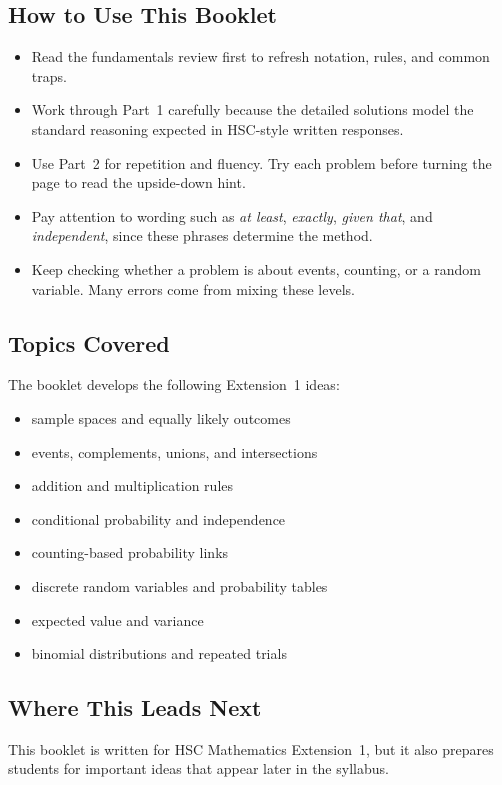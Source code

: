\documentclass[12pt]{article}
\begin{document}
\subsection{How to Use This Booklet}
\begin{itemize}[leftmargin=*]
  \item Read the fundamentals review first to refresh notation, rules, and common traps.
  \item Work through Part~1 carefully because the detailed solutions model the standard reasoning expected in HSC-style written responses.
  \item Use Part~2 for repetition and fluency. Try each problem before turning the page to read the upside-down hint.
  \item Pay attention to wording such as \textit{at least}, \textit{exactly}, \textit{given that}, and \textit{independent}, since these phrases determine the method.
  \item Keep checking whether a problem is about events, counting, or a random variable. Many errors come from mixing these levels.
\end{itemize}

\subsection{Topics Covered}
The booklet develops the following Extension~1 ideas:
\begin{itemize}[leftmargin=*]
  \item sample spaces and equally likely outcomes
  \item events, complements, unions, and intersections
  \item addition and multiplication rules
  \item conditional probability and independence
  \item counting-based probability links
  \item discrete random variables and probability tables
  \item expected value and variance
  \item binomial distributions and repeated trials
\end{itemize}

\subsection{Where This Leads Next}
This booklet is written for HSC Mathematics Extension~1, but it also prepares students for important ideas that appear later in the syllabus.
\end{document}
